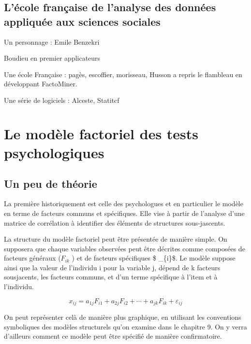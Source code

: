 \documentclass[
]{book}
\begin{document}
\hypertarget{luxe9cole-franuxe7aise-de-lanalyse-des-donnuxe9es-appliquuxe9e-aux-sciences-sociales}{%
\subsection{L'école française de l'analyse des données appliquée aux sciences sociales}\label{luxe9cole-franuxe7aise-de-lanalyse-des-donnuxe9es-appliquuxe9e-aux-sciences-sociales}}

Un personnage : Emile Benzekri

Boudieu en premier applicateurs

Une école Française : pagès, escoffier, morisseau, Husson a repris le flambleau en développant FactoMiner.

Une série de logiciels : Alceste, Statitcf

\hypertarget{le-moduxe8le-factoriel-des-tests-psychologiques}{%
\section{Le modèle factoriel des tests psychologiques}\label{le-moduxe8le-factoriel-des-tests-psychologiques}}

\hypertarget{un-peu-de-thuxe9orie}{%
\subsection{Un peu de théorie}\label{un-peu-de-thuxe9orie}}

La première historiquement est celle des psychologues et en particulier le modèle en terme de facteurs communs et spécifiques. Elle vise à partir de l'analyse d'une matrice de corrélation à identifier des éléments de structures sous-jascents.

La structure du modèle factoriel peut être présentée de manière simple. On supposera que chaque variables observées peut être décrites comme composées de facteurs généraux (\(F_{ik}\) ) et de facteurs spécifiques \$ \varepsilon\_\{i\}\$. Le modèle suppose ainsi que la valeur de l'individu i pour la variable j, dépend de k facteurs sousjacents, les facteurs communs, et d'un terme spécifique à l'item et à l'individu.

\[x_{ij}= a_{1j}F_{i1} + a_{2j}F_{i2} + \cdots + a_{jk}F_{ik}+\varepsilon_{ij}\]

On peut représenter celà de manière plus graphique, en utilisant les conventions symboliques des modèles structurels qu'on examine dans le chapitre 9. On y verra d'ailleurs comment ce modèle peut être spécifié de manière confirmatoire.
\end{document}
